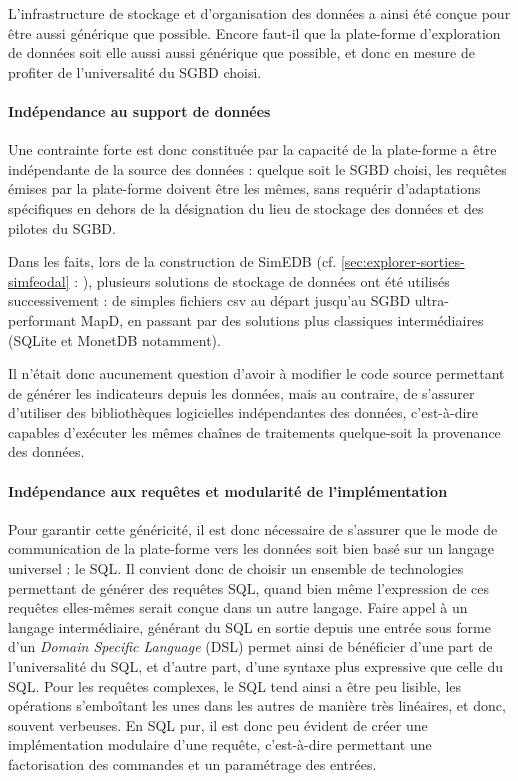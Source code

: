 		L'infrastructure de stockage et d'organisation des données a ainsi été conçue pour être aussi générique que possible.
		Encore faut-il que la plate-forme d'exploration de données soit elle aussi aussi générique que possible, et donc en mesure de profiter de l'universalité du SGBD choisi.
		
			\paragraph*{Indépendance au support de données}
		Une contrainte forte est donc constituée par la capacité de la plate-forme a être indépendante de la source des données : quelque soit le SGBD choisi, les requêtes émises par la plate-forme doivent être les mêmes, sans requérir d'adaptations spécifiques en dehors de la désignation du lieu de stockage des données	et des pilotes du SGBD.
		
		Dans les faits, lors de la construction de SimEDB (cf. \cref{sec:explorer-sorties-simfeodal} : ), plusieurs solutions de stockage de données ont été utilisés successivement : de simples fichiers csv au départ jusqu'au SGBD ultra-performant MapD, en passant par des solutions plus classiques intermédiaires (SQLite et MonetDB notamment).
		
		Il n'était donc aucunement question d'avoir à modifier le code source permettant de générer les indicateurs depuis les données, mais au contraire, de s'assurer d'utiliser des bibliothèques logicielles indépendantes des données, c'est-à-dire capables d'exécuter les mêmes chaînes de traitements quelque-soit la provenance des données.
		
			\paragraph*{Indépendance aux requêtes et modularité de l'implémentation}\label{par:DSL}
			
			Pour garantir cette généricité, il est donc nécessaire de s'assurer que le mode de communication de la plate-forme vers les données soit bien basé sur un langage universel : le SQL.
			Il convient donc de choisir un ensemble de technologies permettant de générer des requêtes SQL, quand bien même l'expression de ces requêtes elles-mêmes serait conçue dans un autre langage.
			Faire appel à un langage intermédiaire, générant du SQL en sortie depuis une entrée sous forme d'un \og \textit{Domain Specific Language}\fg{} (DSL) permet ainsi de bénéficier d'une part de l'universalité du SQL, et d'autre part, d'une syntaxe plus expressive que celle du SQL.
			Pour les requêtes complexes, le SQL tend ainsi a être peu lisible, les opérations s'emboîtant les unes dans les autres de manière très linéaires, et donc, souvent verbeuses.
			En SQL pur, il est donc peu évident de créer une implémentation modulaire d'une requête, c'est-à-dire permettant une factorisation des commandes et un paramétrage des entrées.
			
